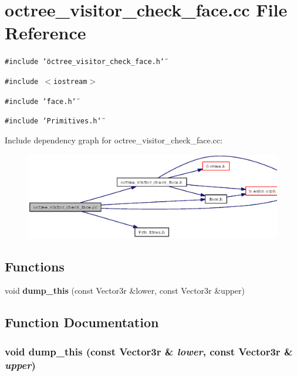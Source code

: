 \section{octree\_\-visitor\_\-check\_\-face.cc File Reference}
\label{octree__visitor__check__face_8cc}
{\tt \#include \char`\"{}octree\_\-visitor\_\-check\_\-face.h\char`\"{}}\par
{\tt \#include $<$iostream$>$}\par
{\tt \#include \char`\"{}face.h\char`\"{}}\par
{\tt \#include \char`\"{}Primitives.h\char`\"{}}\par


Include dependency graph for octree\_\-visitor\_\-check\_\-face.cc:\begin{figure}[H]
\begin{center}
\leavevmode
\includegraphics[width=357pt]{octree__visitor__check__face_8cc__incl}
\end{center}
\end{figure}
\subsection*{Functions}
\begin{CompactItemize}
\item 
void {\bf dump\_\-this} (const Vector3r \&lower, const Vector3r \&upper)
\end{CompactItemize}


\subsection{Function Documentation}
\subsubsection{\setlength{\rightskip}{0pt plus 5cm}void dump\_\-this (const Vector3r \& {\em lower}, const Vector3r \& {\em upper})}\label{octree__visitor__check__face_8cc_7afd8b4856a46316b57496a57598bb1a}


